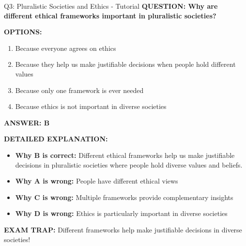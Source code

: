 \documentclass[8pt]{beamer}
\begin{document}
	\begin{frame}{Q3: Pluralistic Societies and Ethics - Tutorial}
		\fontsize{6.5}{7.5}\selectfont
		\textbf{QUESTION: Why are different ethical frameworks important in pluralistic societies?}
		
		\vspace{0.1cm}
		\textbf{OPTIONS:}
		\begin{enumerate}
			\item Because everyone agrees on ethics
			\item Because they help us make justifiable decisions when people hold different values
			\item Because only one framework is ever needed
			\item Because ethics is not important in diverse societies
		\end{enumerate}
		
		\vspace{0.1cm}
		\textcolor{myblue}{\textbf{ANSWER: B}}
		
		\vspace{0.1cm}
		\textbf{DETAILED EXPLANATION:}
		\begin{itemize}
			\item \textbf{Why B is correct:} Different ethical frameworks help us make justifiable decisions in pluralistic societies where people hold diverse values and beliefs.
			\item \textbf{Why A is wrong:} People have different ethical views
			\item \textbf{Why C is wrong:} Multiple frameworks provide complementary insights
			\item \textbf{Why D is wrong:} Ethics is particularly important in diverse societies
		\end{itemize}
		
		\textcolor{myred}{\textbf{EXAM TRAP:}} Different frameworks help make \textcolor{myblue}{justifiable decisions} in diverse societies!
	\end{frame}
	
\end{document}
